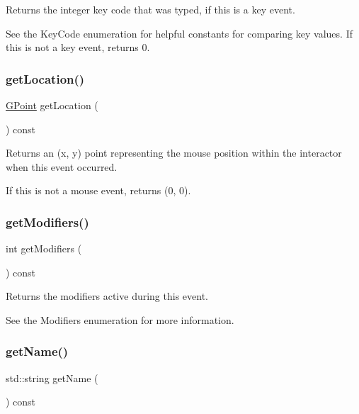 Returns the integer key code that was typed, if this is a key event. 

See the Key\+Code enumeration for helpful constants for comparing key values. If this is not a key event, returns 0. \mbox{\label{classsgl_1_1GEvent_a4f83802015511edeb63b892830812c11}} 
\subsubsection{\texorpdfstring{get\+Location()}{getLocation()}}
{\footnotesize\ttfamily \mbox{\hyperlink{structsgl_1_1GPoint}{G\+Point}} get\+Location (\begin{DoxyParamCaption}{ }\end{DoxyParamCaption}) const\hspace{0.3cm}{\ttfamily [virtual]}}



Returns an (x, y) point representing the mouse position within the interactor when this event occurred. 

If this is not a mouse event, returns (0, 0). \mbox{\label{classsgl_1_1GEvent_ab8f99a1ccd9832faabeee792bc5702e2}} 
\subsubsection{\texorpdfstring{get\+Modifiers()}{getModifiers()}}
{\footnotesize\ttfamily int get\+Modifiers (\begin{DoxyParamCaption}{ }\end{DoxyParamCaption}) const\hspace{0.3cm}{\ttfamily [virtual]}}



Returns the modifiers active during this event. 

See the Modifiers enumeration for more information. \mbox{\label{classsgl_1_1GEvent_a8a60438a5b55d0b2ceb35c8674b9d8c5}} 
\subsubsection{\texorpdfstring{get\+Name()}{getName()}}
{\footnotesize\ttfamily std\+::string get\+Name (\begin{DoxyParamCaption}{ }\end{DoxyParamCaption}) const\hspace{0.3cm}{\ttfamily [virtual]}}



